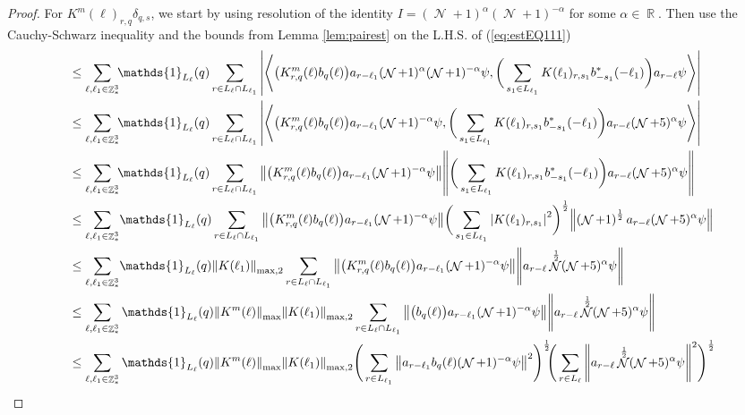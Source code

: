 \documentclass[sn-mathphys, Numbered ,a4paper]{sn-jnl}%
\DeclareMathOperator{\R}{\mathbb{R}}
\DeclareMathOperator{\Z}{\mathbb{Z}}
\DeclareMathOperator{\NN}{\mathcal{N}}
\newcommand{\half}{\frac{1}{2}}
\newcommand{\eva}[1]{\left\langle #1 \right\rangle}
\theoremstyle{plain}
\theoremstyle{definition}
\theoremstyle{remark}
\theoremstyle{plain}
\theoremstyle{definition}
\theoremstyle{remark}
\begin{document}
\begin{proof}
For $ K^m(\ell )_{r,q}\delta_{q,s}$, we start by using resolution of the identity $I = (\NN+1)^{\alpha}(\NN+1)^{-\alpha}$ for some $\alpha \in \R$. Then use the Cauchy-Schwarz inequality and the bounds from Lemma \ref{lem:pairest} on the L.H.S. of (\ref{eq:estEQ111})
\begin{align}
    &\leq \sum\limits_{\ell,\ell_1 \in \Z^3_*}\!\! \mathds{1}_{L_\ell}(q) \sum\limits_{r \in L_\ell \cap L_{\ell_1}}\abs{\eva{\big(K^{m}_{r,q}(\ell)b_{q}(\ell)\big) a_{r-\ell_1}(\NN+1)^{\alpha}(\NN+1)^{-\alpha} \psi, \bigg( \sum\limits_{s_1 \in L_{\ell_1}} K(\ell_1)_{r,s_1}b^*_{-s_1}(-\ell_1) \bigg) a_{r-\ell} \psi }}\nonumber\\
    &\leq \sum\limits_{\ell,\ell_1 \in \Z^3_*} \!\!\mathds{1}_{L_\ell}(q) \sum\limits_{r \in L_\ell \cap L_{\ell_1}}\abs{\eva{\big(K^{m}_{r,q}(\ell)b_{q}(\ell)\big) a_{r-\ell_1}(\NN+1)^{-\alpha} \psi, \bigg( \sum\limits_{s_1 \in L_{\ell_1}} K(\ell_1)_{r,s_1}b^*_{-s_1}(-\ell_1) \bigg) a_{r-\ell}(\NN+5)^{\alpha} \psi }}\nonumber\\
    &\leq \sum\limits_{\ell,\ell_1 \in \Z^3_*} \!\!\mathds{1}_{L_\ell}(q) \sum\limits_{r \in L_\ell \cap L_{\ell_1}}\norm{\big(K^{m}_{r,q}(\ell)b_{q}(\ell)\big) a_{r-\ell_1} (\NN+1)^{-\alpha}\psi}\norm {\bigg( \sum\limits_{s_1 \in L_{\ell_1}} K(\ell_1)_{r,s_1}b^*_{-s_1}(-\ell_1) \bigg) a_{r-\ell} (\NN+5)^{\alpha}\psi }\nonumber\\
    &\leq \sum\limits_{\ell,\ell_1 \in \Z^3_*} \!\mathds{1}_{L_\ell}(q) \sum\limits_{r \in L_\ell\cap L_{\ell_1}} \norm{\big(K^{m}_{r,q}(\ell)b_{q}(\ell)\big) a_{r-\ell_1} (\NN+1)^{-\alpha} \psi}\bigg( \sum\limits_{s_1 \in L_{\ell_1}} \abs{K(\ell_1)_{r,s_1}}^2 \bigg)^\half \norm {\left(\NN+1\right)^\half a_{r-\ell} (\NN+5)^{\alpha} \psi }\nonumber\\
    &\leq \sum\limits_{\ell,\ell_1 \in \Z^3_*} \!\mathds{1}_{L_\ell}(q) \norm{K(\ell_1)}_{\mathrm{max},2} \sum\limits_{r \in L_\ell\cap L_{\ell_1}} \norm{\big(K^{m}_{r,q}(\ell)b_{q}(\ell)\big) a_{r-\ell_1} (\NN+1)^{-\alpha} \psi} \norm { a_{r-\ell}\NN^\half (\NN+5)^{\alpha} \psi }\nonumber\\
    &\leq \sum\limits_{\ell,\ell_1 \in \Z^3_*} \mathds{1}_{L_\ell}(q) \norm{K^{m}(\ell)}_{\mathrm{max}}\norm{K(\ell_1)}_{\mathrm{max},2} \sum\limits_{r \in L_\ell \cap L_{\ell_1}} \norm{\big(b_{q}(\ell)\big) a_{r-\ell_1} (\NN+1)^{-\alpha} \psi} \norm { a_{r-\ell}\NN^\half (\NN+5)^{\alpha} \psi }\nonumber\\
    &\leq \sum\limits_{\ell,\ell_1 \in \Z^3_*} \mathds{1}_{L_\ell}(q) \norm{K^{m}(\ell)}_{\mathrm{max}}\norm{K(\ell_1)}_{\mathrm{max},2} \Bigg(\sum\limits_{r \in L_{\ell_1}} \norm{ a_{r-\ell_1}b_{q}(\ell) (\NN+1)^{-\alpha} \psi}^2\Bigg)^\half\!\!\Bigg( \sum\limits_{r \in L_\ell} \norm { a_{r-\ell}\NN^\half (\NN+5)^{\alpha} \psi }^2\Bigg)^\half\nonumber

\end{align}
\end{proof}
\end{document}
